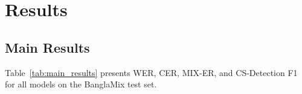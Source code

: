\section{Results}
\label{sec:results}


\subsection{Main Results}

Table~\ref{tab:main_results} presents WER, CER, MIX-ER, and CS-Detection
F1 for all models on the BanglaMix test set.

